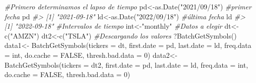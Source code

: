 \documentclass[
]{book}
\newenvironment{Shaded}{\begin{snugshade}}{\end{snugshade}}
\newcommand{\AttributeTok}[1]{\textcolor[rgb]{0.77,0.63,0.00}{#1}}
\newcommand{\CommentTok}[1]{\textcolor[rgb]{0.56,0.35,0.01}{\textit{#1}}}
\newcommand{\ConstantTok}[1]{\textcolor[rgb]{0.00,0.00,0.00}{#1}}
\newcommand{\DecValTok}[1]{\textcolor[rgb]{0.00,0.00,0.81}{#1}}
\newcommand{\FunctionTok}[1]{\textcolor[rgb]{0.00,0.00,0.00}{#1}}
\newcommand{\NormalTok}[1]{#1}
\newcommand{\OtherTok}[1]{\textcolor[rgb]{0.56,0.35,0.01}{#1}}
\newcommand{\StringTok}[1]{\textcolor[rgb]{0.31,0.60,0.02}{#1}}
\begin{document}
\begin{Shaded}
\begin{Highlighting}[]
\CommentTok{\#Primero determinamos el lapso de tiempo}
\NormalTok{pd}\OtherTok{\textless{}{-}}\FunctionTok{as.Date}\NormalTok{(}\StringTok{"2021/09/18"}\NormalTok{) }\CommentTok{\#primer fecha}
\NormalTok{pd}
\CommentTok{\#\textgreater{} [1] "2021{-}09{-}18"}
\NormalTok{ld}\OtherTok{\textless{}{-}}\FunctionTok{as.Date}\NormalTok{(}\StringTok{"2022/09/18"}\NormalTok{) }\CommentTok{\#última fecha}
\NormalTok{ld}
\CommentTok{\#\textgreater{} [1] "2022{-}09{-}18"}
\CommentTok{\#Intervalos de tiempo}
\NormalTok{int}\OtherTok{\textless{}{-}}\StringTok{"monthly"}
\CommentTok{\#Datos a elegir}
\NormalTok{dt}\OtherTok{\textless{}{-}}\FunctionTok{c}\NormalTok{(}\StringTok{"AMZN"}\NormalTok{)}
\NormalTok{dt2}\OtherTok{\textless{}{-}}\FunctionTok{c}\NormalTok{(}\StringTok{"TSLA"}\NormalTok{)}
\CommentTok{\#Descargando los valores}
\NormalTok{?}\FunctionTok{BatchGetSymbols}\NormalTok{()}
\NormalTok{data1}\OtherTok{\textless{}{-}} \FunctionTok{BatchGetSymbols}\NormalTok{(}\AttributeTok{tickers =}\NormalTok{ dt,}
                       \AttributeTok{first.date =}\NormalTok{ pd,}
                       \AttributeTok{last.date =}\NormalTok{ ld,}
                       \AttributeTok{freq.data =}\NormalTok{ int,}
                       \AttributeTok{do.cache =} \ConstantTok{FALSE}\NormalTok{,}
                       \AttributeTok{thresh.bad.data =} \DecValTok{0}\NormalTok{)}
\NormalTok{data2}\OtherTok{\textless{}{-}} \FunctionTok{BatchGetSymbols}\NormalTok{(}\AttributeTok{tickers =}\NormalTok{ dt2,}
                       \AttributeTok{first.date =}\NormalTok{ pd,}
                       \AttributeTok{last.date =}\NormalTok{ ld,}
                       \AttributeTok{freq.data =}\NormalTok{ int,}
                       \AttributeTok{do.cache =} \ConstantTok{FALSE}\NormalTok{,}
                       \AttributeTok{thresh.bad.data =} \DecValTok{0}\NormalTok{)}


\end{Highlighting}
\end{Shaded}
\end{document}
